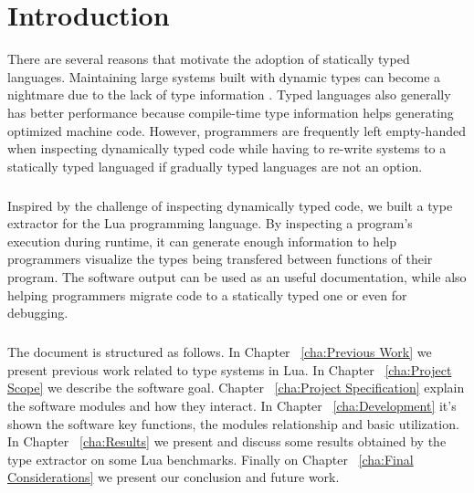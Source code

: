 
\chapter{Introduction}
There are several reasons that motivate the adoption of statically typed languages. Maintaining large systems built with dynamic types can become a nightmare due to the lack of type information \cite{takikawa_is_2016}. Typed languages also generally has better performance because compile-time type information helps generating optimized machine code. However, programmers are frequently left empty-handed when inspecting dynamically typed code while having to re-write systems to a statically typed languaged if gradually typed languages are not an option.
\paragraph*{}
Inspired by the challenge of inspecting dynamically typed code, we built a type extractor for the Lua programming language. By inspecting a program's execution during runtime, it can generate enough information to help programmers visualize the types being transfered between functions of their program. The software output can be used as an useful documentation, while also helping programmers migrate code to a statically typed one or even for debugging.
\paragraph*{}
The document is structured as follows. In Chapter ~\ref{cha:Previous Work} we present previous work related to type systems in Lua. In Chapter ~\ref{cha:Project Scope} we describe the software goal. Chapter ~\ref{cha:Project Specification} explain the software modules and how they interact. In Chapter ~\ref{cha:Development} it's shown the software key functions, the modules relationship and basic utilization. In Chapter ~\ref{cha:Results} we present and discuss some results obtained by the type extractor on some Lua benchmarks. Finally on Chapter ~\ref{cha:Final Considerations} we present our conclusion and future work.




